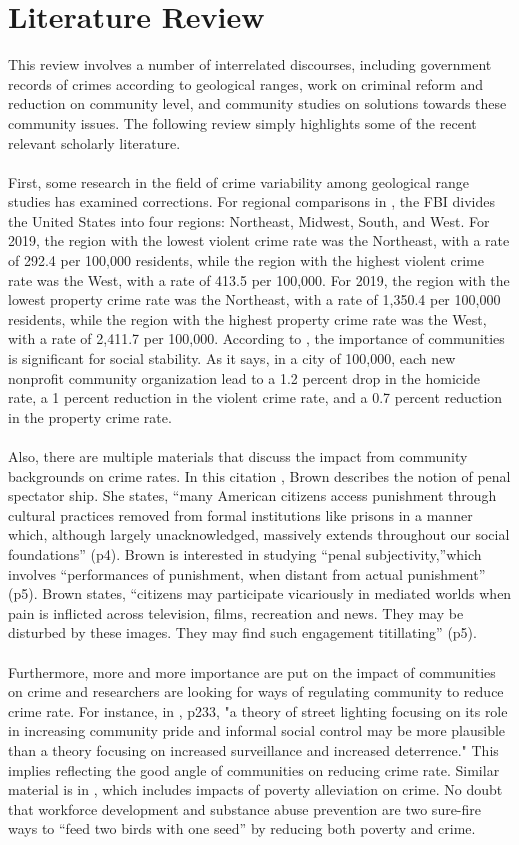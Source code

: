 \documentclass[letterpaper, 11 pt, conference]{article}
\begin{document}
\section{Literature Review}
This review involves a number of interrelated discourses, including government records of crimes according to geological ranges, work on criminal reform and reduction on community level, and community studies on solutions towards these community issues. The following review simply highlights some of the recent relevant scholarly literature.
\\
\\First, some research in the field of crime variability among geological range studies has examined corrections. For regional comparisons in \cite{greenwade93}, the FBI divides the United States into four regions: Northeast, Midwest, South, and West. For 2019, the region with the lowest violent crime rate was the Northeast, with a rate of 292.4 per 100,000 residents, while the region with the highest violent crime rate was the West, with a rate of 413.5 per 100,000. For 2019, the region with the lowest property crime rate was the Northeast, with a rate of 1,350.4 per 100,000 residents, while the region with the highest property crime rate was the West, with a rate of 2,411.7 per 100,000. According to \cite{ref1}, the importance of communities is significant for social stability. As it says, in a city of 100,000, each new nonprofit community organization lead to a 1.2 percent drop in the homicide rate, a 1 percent reduction in the violent crime rate, and a 0.7 percent reduction in the property crime rate.
\\
\\Also, there are multiple materials that discuss the impact from community backgrounds on crime rates. In this citation \cite{ref5}, Brown describes the notion of penal spectator ship. She states, “many American citizens access punishment through cultural practices removed from formal institutions like prisons in a manner which, although largely unacknowledged, massively extends throughout our social foundations” (p4). Brown is interested in studying “penal subjectivity,”which involves “performances of punishment, when distant from actual punishment” (p5). Brown states, “citizens may participate vicariously in mediated worlds when pain is inflicted across television, films, recreation and news. They may be disturbed by these images. They may find such engagement titillating” (p5). 
\\
\\Furthermore, more and more importance are put on the impact of communities on crime and researchers are looking for ways of regulating community to reduce crime rate. For instance, in \cite{ref2}, p233, "a theory of street lighting focusing on its role in increasing community pride and informal social control may be more plausible than a theory focusing on increased surveillance and increased deterrence." This implies reflecting the good angle of communities on reducing crime rate. Similar material is in \cite{ref4}, which includes impacts of poverty alleviation on crime. No doubt that workforce development and substance abuse prevention are two sure-fire ways to “feed two birds with one seed” by reducing both poverty and crime. 
\\
\end{document}
